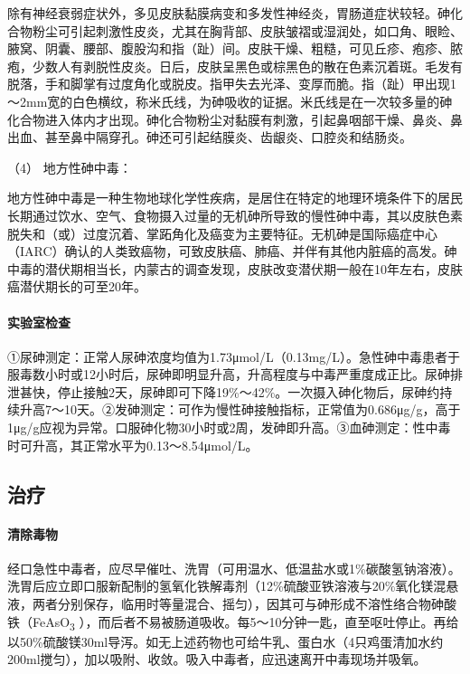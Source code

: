 除有神经衰弱症状外，多见皮肤黏膜病变和多发性神经炎，胃肠道症状较轻。砷化合物粉尘可引起刺激性皮炎，尤其在胸背部、皮肤皱褶或湿润处，如口角、眼睑、腋窝、阴囊、腰部、腹股沟和指（趾）间。皮肤干燥、粗糙，可见丘疹、疱疹、脓疱，少数人有剥脱性皮炎。日后，皮肤呈黑色或棕黑色的散在色素沉着斑。毛发有脱落，手和脚掌有过度角化或脱皮。指甲失去光泽、变厚而脆。指（趾）甲出现1～2mm宽的白色横纹，称米氏线，为砷吸收的证据。米氏线是在一次较多量的砷化合物进入体内才出现。砷化合物粉尘对黏膜有刺激，引起鼻咽部干燥、鼻炎、鼻出血、甚至鼻中隔穿孔。砷还可引起结膜炎、齿龈炎、口腔炎和结肠炎。

\hypertarget{text00160.htmlux5cux23CHP5-6-4-1-2-2-4}{}
（4） 地方性砷中毒：

地方性砷中毒是一种生物地球化学性疾病，是居住在特定的地理环境条件下的居民长期通过饮水、空气、食物摄入过量的无机砷所导致的慢性砷中毒，其以皮肤色素脱失和（或）过度沉着、掌跖角化及癌变为主要特征。无机砷是国际癌症中心（IARC）确认的人类致癌物，可致皮肤癌、肺癌、并伴有其他内脏癌的高发。砷中毒的潜伏期相当长，内蒙古的调查发现，皮肤改变潜伏期一般在10年左右，皮肤癌潜伏期长的可至20年。

\paragraph{实验室检查}

①尿砷测定：正常人尿砷浓度均值为1.73μmol/L（0.13mg/L）。急性砷中毒患者于服毒数小时或12小时后，尿砷即明显升高，升高程度与中毒严重度成正比。尿砷排泄甚快，停止接触2天，尿砷即可下降19\%～42\%。一次摄入砷化物后，尿砷约持续升高7～10天。②发砷测定：可作为慢性砷接触指标，正常值为0.686μg/g，高于1μg/g应视为异常。口服砷化物30小时或2周，发砷即升高。③血砷测定：性中毒时可升高，其正常水平为0.13～8.54μmol/L。

\subsection{治疗}

\paragraph{清除毒物}

经口急性中毒者，应尽早催吐、洗胃（可用温水、低温盐水或1\%碳酸氢钠溶液）。洗胃后应立即口服新配制的氢氧化铁解毒剂（12\%硫酸亚铁溶液与20\%氧化镁混悬液，两者分别保存，临用时等量混合、摇匀），因其可与砷形成不溶性络合物砷酸铁（FeAsO\textsubscript{3}
），而后者不易被肠道吸收。每5～10分钟一匙，直至呕吐停止。再给以50\%硫酸镁30ml导泻。如无上述药物也可给牛乳、蛋白水（4只鸡蛋清加水约200ml搅匀），加以吸附、收敛。吸入中毒者，应迅速离开中毒现场并吸氧。

